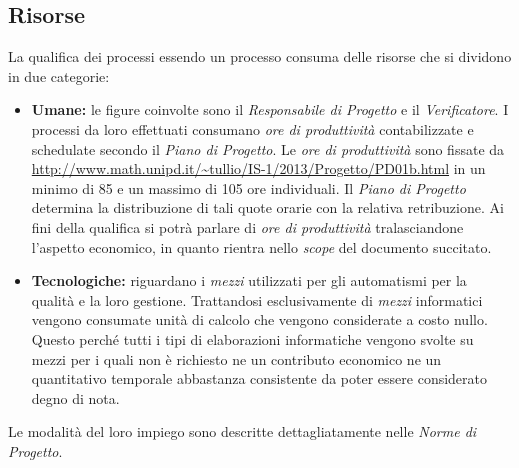 	\subsection{Risorse}
	La qualifica dei processi essendo un processo consuma delle risorse che si dividono in due categorie:
		\begin{itemize}
  			\item \textbf{Umane:} le figure coinvolte sono il \emph{Responsabile di Progetto} e il \emph{Verificatore}. I processi da loro effettuati consumano \emph{ore di produttività}  contabilizzate e schedulate secondo il \emph{Piano di Progetto}. Le \emph{ore di produttività} sono fissate da \url{http://www.math.unipd.it/~tullio/IS-1/2013/Progetto/PD01b.html} in un minimo di 85 e un massimo di 105 ore individuali. Il \emph{Piano di Progetto} determina la distribuzione di tali quote orarie con la relativa retribuzione. Ai fini della qualifica si potrà parlare di \emph{ore di produttività} tralasciandone l'aspetto economico, in quanto rientra nello \emph{scope} del documento succitato. 
  			
  			\item \textbf{Tecnologiche:} riguardano i \emph{mezzi} utilizzati per gli automatismi per la qualità e la loro gestione. Trattandosi esclusivamente di \emph{mezzi} informatici vengono consumate unità di calcolo che vengono considerate a costo nullo. Questo perché tutti i tipi di elaborazioni informatiche vengono svolte su mezzi per i quali non è richiesto ne un contributo economico ne un quantitativo temporale abbastanza consistente da poter essere considerato degno di nota.
		\end{itemize}
		
	Le modalità del loro impiego sono descritte dettagliatamente nelle \emph{Norme di Progetto}.
	
		
		
